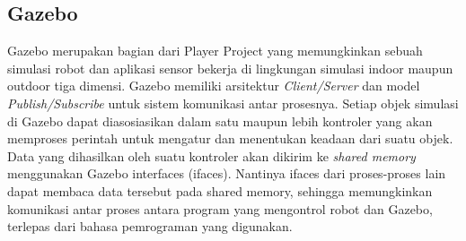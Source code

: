 \subsection{Gazebo}

Gazebo \citep{Koenig2004} merupakan bagian dari Player Project \citep{Gerkey2003} yang memungkinkan sebuah simulasi robot dan aplikasi sensor bekerja di lingkungan simulasi indoor maupun outdoor tiga dimensi.
Gazebo memiliki arsitektur \emph{Client/Server} dan model \emph{Publish/Subscribe} untuk sistem komunikasi antar prosesnya.
Setiap objek simulasi di Gazebo dapat diasosiasikan dalam satu maupun lebih kontroler yang akan memproses perintah untuk mengatur dan menentukan keadaan dari suatu objek.
Data yang dihasilkan oleh suatu kontroler akan dikirim ke \emph{shared memory} menggunakan Gazebo interfaces (ifaces).
Nantinya ifaces dari proses-proses lain dapat membaca data tersebut pada shared memory, sehingga memungkinkan komunikasi antar proses antara program yang mengontrol robot dan Gazebo, terlepas dari bahasa pemrograman yang digunakan.
